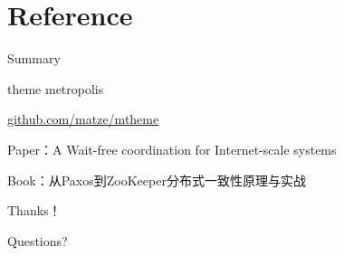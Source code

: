 \documentclass[10pt]{beamer}
\begin{document}
\section{Reference}

\begin{frame}{Summary}

  theme metropolis

  \url{github.com/matze/mtheme}

  Paper：A Wait-free coordination for Internet-scale systems

  Book：从Paxos到ZooKeeper分布式一致性原理与实战

  \begin{center}\ccbysa\end{center}

\end{frame}

\begin{frame}[standout]
  Thanks！
\end{frame}

\begin{frame}[standout]
  Questions?
\end{frame}

\end{document}
